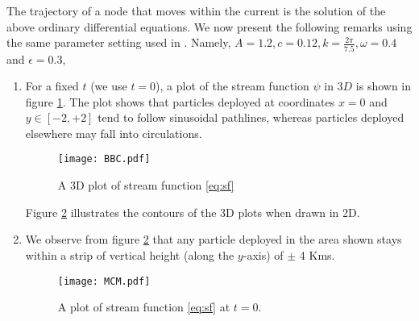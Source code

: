 The trajectory of a node that moves within the current is the solution of the above ordinary differential equations.
We now present the following remarks using the same parameter setting used in \cite{caruso2008meandering}. Namely, $A=1.2, c=0.12, k=\frac{2\pi}{7.5}, \omega=0.4$ and $\epsilon=0.3$, 

\begin{enumerate}
\item For a fixed $t$ (we use $t=0$), a plot of the stream function $\psi$ in $3D$ is shown in figure \ref{fig:kme3d}.
The plot shows that particles deployed at coordinates $x=0$ and $y\in [-2,+2]$ tend to follow sinusoidal pathlines, whereas particles deployed elsewhere may fall into circulations.
\begin{figure}[!htb]
\centering
\texttt{[image: BBC.pdf]}
 \caption{ A 3D plot of stream function \ref{eq:sf}}
 \label{fig:kme3d}
\end{figure}

Figure \ref{fig:kme} illustrates the contours of the 3D plots when drawn in 2D.

\item We observe from figure \ref{fig:kme} that any particle deployed in the area shown stays within a strip of vertical height (along the $y$-axis) of $\pm$ 4 Kms.

\begin{figure}[!htb]
\centering
\texttt{[image: MCM.pdf]}
 \caption{ A plot of stream function \ref{eq:sf} at $t=0$.}
 \label{fig:kme}
\end{figure}


\end{enumerate}
